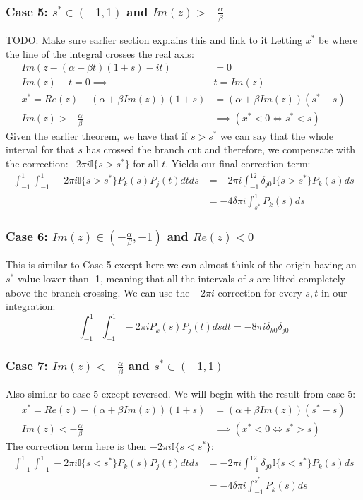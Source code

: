 \documentclass{article}
\begin{document}
\subsubsection{Case 5: $s^*\in(-1,1)$ and $Im(z)>-\frac{\alpha}{\beta}$}
TODO: Make sure earlier section explains this and link to it
Letting $x^*$ be where the line of the integral crosses the real axis:
\begin{align}
    Im(z-(\alpha+\beta t)(1+s)-it)&=0\\
    Im(z)-t=0\implies &t=Im(z)\\
    x^*=Re(z)-(\alpha+\beta Im(z))(1+s)&=(\alpha+\beta Im(z))(s^*-s)\\
    Im(z)>-\frac{\alpha}{\beta}&\implies (x^*<0 \iff s^*<s)
\end{align}
Given the earlier theorem, we have that if $s>s^*$ we can say that the whole interval for that $s$ has crossed the branch cut and therefore, we compensate with the correction:$-2\pi i\mathbb{I}\{s>s^*\}$ for all $t$.
Yields our final correction term:
\begin{align}
    \int_{-1}^1\int_{-1}^1-2\pi i\mathbb{I}\{s>s^*\}P_k(s)P_j(t)dtds&=-2\pi i\int_{-1}^12\delta_{j0}\mathbb{I}\{s>s^*\}P_k(s)ds\\
    &=-4\delta\pi i\int_{s^*}^1P_k(s)ds
\end{align}

\subsubsection{Case 6: $Im(z)\in(-\frac{\alpha}{\beta},-1)$ and $Re(z)<0$}
This is similar to Case 5 except here we can almost think of the origin having an $s^*$ value lower than -1, meaning that all the intervals of $s$ are lifted completely above the branch crossing.
We can use the $-2\pi i$ correction for every $s,t$ in our integration:
$$\int_{-1}^1\int_{-1}^1-2\pi iP_k(s)P_j(t)dsdt=-8\pi i\delta_{k0}\delta_{j0}$$

\subsubsection{Case 7: $Im(z)<-\frac{\alpha}{\beta}$ and $s^*\in(-1,1)$}
Also similar to case 5 except reversed.
We will begin with the result from case 5:
\begin{align}
    x^*=Re(z)-(\alpha+\beta Im(z))(1+s)&=(\alpha+\beta Im(z))(s^*-s)\\
    Im(z)<-\frac{\alpha}{\beta}&\implies (x^*<0 \iff s^*>s)
\end{align}
The correction term here is then $-2\pi i\mathbb{I}\{s<s^*\}$:
\begin{align}
    \int_{-1}^1\int_{-1}^1-2\pi i\mathbb{I}\{s<s^*\}P_k(s)P_j(t)dtds&=-2\pi i\int_{-1}^12\delta_{j0}\mathbb{I}\{s<s^*\}P_k(s)ds\\
    &=-4\delta\pi i\int_{-1}^{s^*}P_k(s)ds
\end{align}
\end{document}
